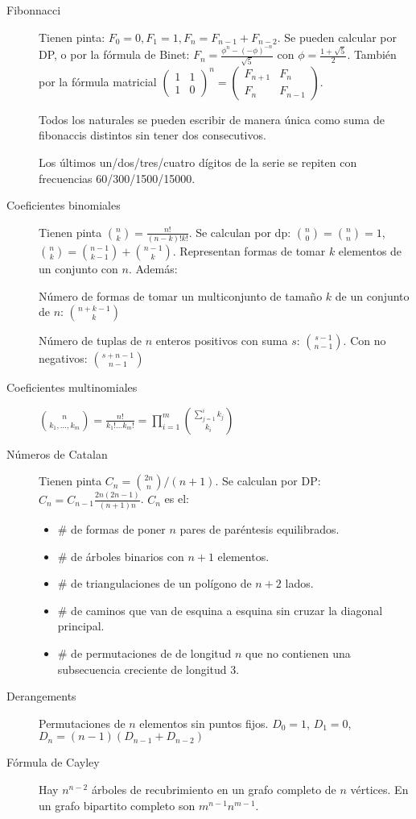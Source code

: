 \begin{description}
	\item[Fibonnacci]
	Tienen pinta: $F_0=0, F_1=1, F_n=F_{n-1}+F_{n-2}$. Se pueden calcular por
	DP, o por la fórmula de Binet: $F_n=\frac{\phi^n-(-\phi)^{-n}}{\sqrt{5}}$ con $\phi=\frac{1+\sqrt{5}}{2}$.
	También por la fórmula matricial $\left(\begin{matrix} 1 & 1 \\ 1 & 0 \end{matrix}\right)^n=
	\left(\begin{matrix} F_{n+1} & F_n \\ F_n & F_{n-1} \end{matrix}\right)$.
	\begin{teo}[Zeckendorf] Todos los naturales se pueden escribir de manera única como suma de
		fibonaccis distintos sin tener dos consecutivos.
	\end{teo}
	\begin{teo}[Pisano] Los últimos un/dos/tres/cuatro dígitos de la serie se repiten con frecuencias
		60/300/1500/15000.
	\end{teo}
	\item[Coeficientes binomiales]
	Tienen pinta $\binom{n}{k}=\frac{n!}{(n-k)!k!}$. Se calculan por dp: $\binom{n}{0}=\binom{n}{n}=1$,
	$\binom{n}{k}=\binom{n-1}{k-1}+\binom{n-1}{k}$. Representan formas de tomar $k$ elementos de un
	conjunto con $n$. Además:
	\begin{prop}Número de formas de tomar un multiconjunto de tamaño $k$ de un conjunto de $n$: $\binom{n+k-1}{k}$\end{prop}
	\begin{prop}Número de tuplas de $n$ enteros positivos con suma $s$: $\binom{s-1}{n-1}$. Con no negativos: $\binom{s+n-1}{n-1}$
	\end{prop}
	\item[Coeficientes multinomiales]
	$\binom{n}{k_1,\ldots,k_m}=\frac{n!}{k_1!\ldots k_m!}=\prod^{m}_{i = 1}\binom{\sum^{i}_{j = 1}k_j}{k_i}$
	\item[Números de Catalan]
	Tienen pinta $C_n=\binom{2n}{n}/(n+1)$. Se calculan por DP: $C_n=C_{n-1}\frac{2n(2n-1)}{(n+1)n}$. $C_n$ es el:
		\begin{itemize}
			\item \# de formas de poner $n$ pares de paréntesis equilibrados.
			\item \# de árboles binarios con $n + 1$ elementos.
			\item \# de triangulaciones de un polígono de $n + 2$ lados.
			\item \# de caminos que van de esquina a esquina sin cruzar la diagonal principal.
			\item \# de permutaciones de de longitud $n$ que no contienen una subsecuencia creciente de longitud 3.
		\end{itemize}
	\item[Derangements]
	Permutaciones de $n$ elementos sin puntos fijos. $D_0=1$, $D_1=0$, $D_n=(n-1)(D_{n-1}+D_{n-2})$
	\item[Fórmula de Cayley]
	Hay $n^{n-2}$ árboles de recubrimiento en un grafo completo de $n$ vértices. En un grafo
	bipartito completo son $m^{n-1}n^{m-1}$.
\end{description}

